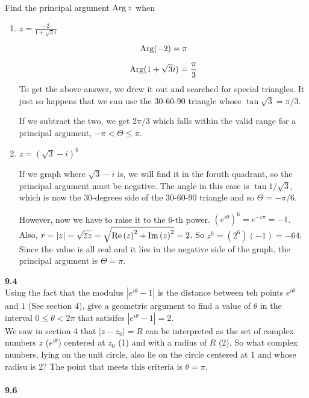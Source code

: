 Find the principal argument $\operatorname{Arg} z$ when
\begin{enumerate}
\item $z = \frac{-2}{1 + \sqrt{3}i}$

$$
\operatorname{Arg} (-2) = \pi
$$

$$
\operatorname{Arg} (1 + \sqrt{3}i) = \frac{\pi}{3}
$$
To get the above answer, we drew it out and searched for special triangles.
It just so happens that we can use the 30-60-90 triangle whose $\tan \sqrt{3} = \pi/3$.

If we subtract the two, we get $2\pi/3$ which falls within the valid range for a principal argument, $-\pi < \Theta \leq \pi$.

\item $z = \left(\sqrt{3}-i\right)^6$

If we graph where $\sqrt{3}-i$ is, we will find it in the foruth quadrant, so the principal argument must be negative.
The angle in this case is $\tan 1/\sqrt{3}$, which is now the 30-degrees side of the 30-60-90 triangle and so $\Theta = -\pi/6$.

However, now we have to raise it to the 6-th power.
$\left(e^{i\theta}\right)^6 = e^{-i\pi} = -1$.
Also, $r = |z| = \sqrt{\overline{z}z} = \sqrt{\operatorname{Re}{(z)}^2 + \operatorname{Im}{(z)}^2 } = 2$.
So $z^6 = (2^6)(-1) = -64$.
Since the value is all real and it lies in the negative side of the graph, the principal argument is $\Theta = \pi$.

\end{enumerate}


\textbf{9.4}
\\

Using the fact that the modulus $|e^{i\theta} - 1|$ is the distance between teh points $e^{i\theta}$ and $1$
(See section 4), give a geometric argument to find a value of $\theta$ in the interval $0 \leq \theta < 2\pi$
that satisifes $|e^{i\theta} - 1| = 2$.
\\

We saw in section 4 that $|z - z_0| = R$ can be interpreted as the set of complex numbers $z$ ($e^{i\theta}$)
centered at $z_0$ (1) and with a radius of $R$ (2).
So what complex numbers, lying on the unit circle, also lie on the circle centered at 1 and whose radisu is 2?
The point that meets this criteria is $\theta = \pi$.
\\~\\



\textbf{9.6}
\\

